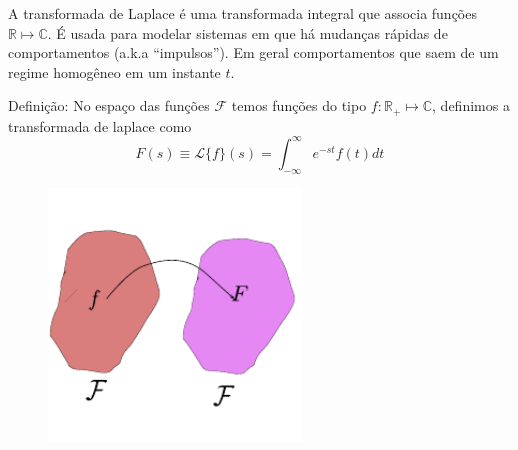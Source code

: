 A transformada de Laplace é uma transformada integral que associa funções $\mathbb{R} \mapsto \mathbb{C}$.
É usada para modelar sistemas em que há mudanças rápidas de comportamentos (a.k.a ``impulsos''). Em
geral comportamentos que saem de um regime homogêneo em um instante $t$.

\begin{theorem}
  Definição: No espaço das funções $\mathcal{F}$ temos funções do tipo $f:\mathbb{R}_{+} \mapsto \mathbb{C}$,
  definimos a transformada de laplace como
  \begin{equation}
  F(s) \equiv \mathcal{L} \{ f \} (s) = \int_{-\infty}^{\infty} e^{-st} f(t) dt
  \label{eq:transformada_laplace}
  \end{equation}
\end{theorem}

\begin{figure}[h!]
  \centering
  \includegraphics[width=0.6\textwidth]{./images/transformada_laplace.pdf}
\end{figure}


\def\fx{exp(\x) / (\x + 1)}
\def\gx{(\x + 2) / (\x - 1)}
\def\hx{(\x - 4) / (\x + 3) + \x / 2 + 2}
\begin{figure}
  \centering
{}
\end{figure}





